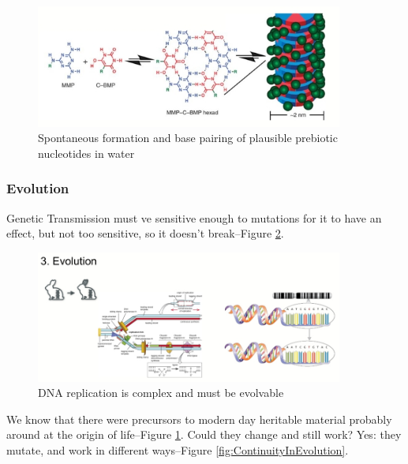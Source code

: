 \documentclass[]{article}
\begin{document}
\begin{figure}[H]
	\caption{Spontaneous formation and base pairing of plausible prebiotic nucleotides in water}\label{fig:SpontaneousFormation}
	\includegraphics[width=0.9\textwidth]{SpontaneousFormation}
\end{figure}

\subsubsection{Evolution}

Genetic Transmission must ve sensitive enough to mutations for it to have an effect, but not too sensitive, so it doesn't break--Figure \ref{fig:EvolutionOfEvolution}.
\begin{figure}[H]
	\caption{DNA replication is complex and must be evolvable}\label{fig:EvolutionOfEvolution}
	\includegraphics[width=0.9\textwidth]{EvolutionOfEvolution}
\end{figure}

We know that there were precursors to modern day heritable material probably around at the origin of life--Figure \ref{fig:SpontaneousFormation}\cite{cafferty2016spontaneous}. Could they change and still work? Yes: they mutate, and work in different ways--Figure \ref{fig:ContinuityInEvolution}\cite{fontana1998continuity}.
\end{document}
